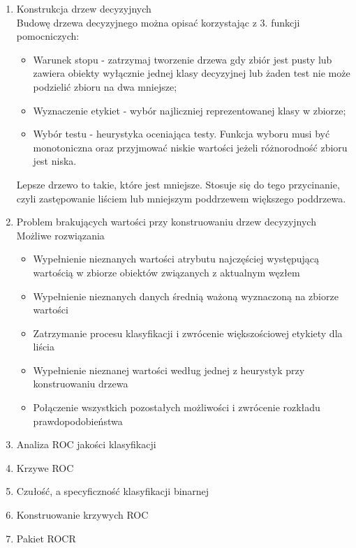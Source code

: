 \documentclass[11pt]{article}
\begin{document}
\begin{enumerate}
        \item Konstrukcja drzew decyzyjnych \\
        Budowę drzewa decyzyjnego można opisać korzystając z 3. funkcji pomocniczych:
        \begin{itemize}
        	\item Warunek stopu - zatrzymaj tworzenie drzewa gdy zbiór jest pusty lub
        	zawiera obiekty wyłącznie jednej klasy decyzyjnej lub żaden test nie może
        	podzielić zbioru na dwa mniejsze;
        	\item Wyznaczenie etykiet - wybór najliczniej reprezentowanej klasy w zbiorze;
        	\item Wybór testu - heurystyka oceniająca testy. Funkcja wyboru musi być
        	monotoniczna oraz przyjmować niskie wartości jeżeli różnorodność zbioru jest
        	niska.
        \end{itemize}
        Lepsze drzewo to takie, które jest mniejsze. Stosuje się do tego przycinanie,
        czyli zastępowanie liściem lub mniejszym poddrzewem większego poddrzewa.
        
        \item Problem brakujących wartości przy konstruowaniu drzew decyzyjnych \\
        Możliwe rozwiązania
        \begin{itemize}
        	\item Wypełnienie nieznanych wartości atrybutu najczęściej
        	występującą wartością w zbiorze obiektów związanych z
        	aktualnym węzłem
        	\item Wypełnienie nieznanych danych średnią ważoną wyznaczoną na
        	zbiorze wartości
        	\item Zatrzymanie procesu klasyfikacji i zwrócenie większościowej etykiety
        	dla liścia
        	\item Wypełnienie nieznanej wartości według jednej z heurystyk przy
        	konstruowaniu drzewa
        	\item Połączenie wszystkich pozostałych możliwości i zwrócenie rozkładu
        	prawdopodobieństwa
        \end{itemize}
        \item Analiza ROC jakości klasyfikacji
        \item Krzywe ROC
        \item Czułość, a specyficzność klasyfikacji binarnej
        \item Konstruowanie krzywych ROC
        \item Pakiet ROCR
    \end{enumerate}
    
\end{document}
